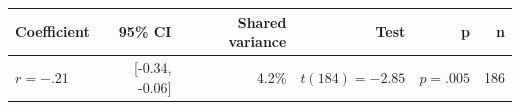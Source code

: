 \begin{tabular}{lrrrrr}
\toprule
Coefficient & 95\% CI & Shared variance & Test & p & n \\
\midrule
$r=-.21$ & [-0.34, -0.06] & 4.2\% & $t(184)=-2.85$ & $p=.005$ & 186 \\
\bottomrule
\end{tabular}
